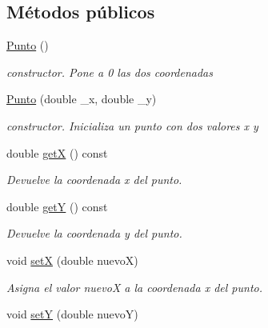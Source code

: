 \subsection*{Métodos públicos}
\begin{DoxyCompactItemize}
\item 
\hyperlink{classPunto_a4b8b70b933ff13493ee5ddb3c8532c10}{Punto} ()\hypertarget{classPunto_a4b8b70b933ff13493ee5ddb3c8532c10}{}\label{classPunto_a4b8b70b933ff13493ee5ddb3c8532c10}

\begin{DoxyCompactList}\small\item\em constructor. Pone a 0 las dos coordenadas \end{DoxyCompactList}\item 
\hyperlink{classPunto_a91b4238ec1ca3ddfb7b60b601a908d25}{Punto} (double \+\_\+x, double \+\_\+y)\hypertarget{classPunto_a91b4238ec1ca3ddfb7b60b601a908d25}{}\label{classPunto_a91b4238ec1ca3ddfb7b60b601a908d25}

\begin{DoxyCompactList}\small\item\em constructor. Inicializa un punto con dos valores x y \end{DoxyCompactList}\item 
double \hyperlink{classPunto_aa218292fec9bad5ec6d71d4bd9173d9d}{getX} () const \hypertarget{classPunto_aa218292fec9bad5ec6d71d4bd9173d9d}{}\label{classPunto_aa218292fec9bad5ec6d71d4bd9173d9d}

\begin{DoxyCompactList}\small\item\em Devuelve la coordenada x del punto. \end{DoxyCompactList}\item 
double \hyperlink{classPunto_a214978b8bbae48ca5927f2e56fb3bd22}{getY} () const \hypertarget{classPunto_a214978b8bbae48ca5927f2e56fb3bd22}{}\label{classPunto_a214978b8bbae48ca5927f2e56fb3bd22}

\begin{DoxyCompactList}\small\item\em Devuelve la coordenada y del punto. \end{DoxyCompactList}\item 
void \hyperlink{classPunto_a51ae6616f828bb2b4111bc8ace49dbca}{setX} (double nuevoX)\hypertarget{classPunto_a51ae6616f828bb2b4111bc8ace49dbca}{}\label{classPunto_a51ae6616f828bb2b4111bc8ace49dbca}

\begin{DoxyCompactList}\small\item\em Asigna el valor nuevoX a la coordenada x del punto. \end{DoxyCompactList}\item 
void \hyperlink{classPunto_a6a0f8adb5946f31a7867a06f54d97462}{setY} (double nuevoY)\hypertarget{classPunto_a6a0f8adb5946f31a7867a06f54d97462}{}\label{classPunto_a6a0f8adb5946f31a7867a06f54d97462}


\end{DoxyCompactItemize}
